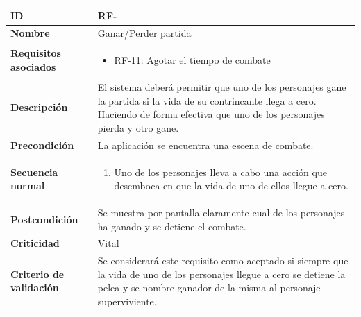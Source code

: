 \begin{center}
	\begin{tabular}{ | p{4.7cm} | p{10cm} | } 
		\hline
		
		\textbf{ID} & RF-\arabic{contador_requisitos_funcionales}
		{contador_requisitos_funcionales} \\
		
		\hline 
		\textbf{Nombre} &
		Ganar/Perder partida\\ 
		
		\hline
		\textbf{Requisitos asociados} & 
		\begin{itemize}
			\item RF-11: Agotar el tiempo de combate
		\end{itemize}\\
		
		\hline
		\textbf{Descripción} & 
		El sistema deberá permitir que uno de los personajes gane la partida si la vida de su contrincante llega a cero. Haciendo de forma efectiva que uno de los personajes pierda y otro gane.\\
		
		\hline
		\textbf{Precondición} & 
		La aplicación se encuentra una escena de combate.\\
		
		\hline
		\textbf{Secuencia normal} &
		\begin{enumerate}
			\item Uno de los personajes lleva a cabo una acción que desemboca en que la vida de uno de ellos llegue a cero.
		\end{enumerate}
		\\
		
		\hline
		\textbf{Postcondición} & 
		Se muestra por pantalla claramente cual de los personajes ha ganado y se detiene el combate.\\
		
		\hline 
		\textbf{Criticidad} &
		Vital\\
		
		\hline 
		\textbf{Criterio de validación} & 
		Se considerará este requisito como aceptado si siempre que la vida de uno de los personajes llegue a cero se detiene la pelea y se nombre ganador de la misma al personaje superviviente.\\
		
		\hline
	\end{tabular}
\end{center}

